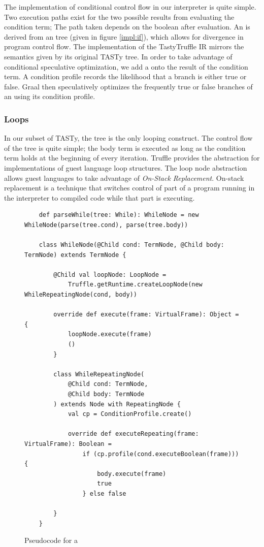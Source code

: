The implementation of conditional control flow in our interpreter is quite simple.
Two execution paths exist for the two possible results from evaluating the condition term; The path taken depends on the boolean after evaluation.
An  is derived from an  tree (given in figure \ref{impl:if}), which allows for divergence in program control flow.
The implementation of the TastyTruffle IR mirrors the semantics given by its original TASTy tree.
In order to take advantage of conditional speculative optimization, we add a  onto the result of the condition term.
A condition profile records the likelihood that a branch is either true or false.
Graal then speculatively optimizes the frequently true or false branches of an  using its condition profile.

\subsubsection*{Loops}

In our subset of TASTy, the  tree is the only looping construct.
The control flow of the  tree is quite simple; the body term is executed as long as the condition term holds at the beginning of every iteration.
Truffle provides the  abstraction for implementations of guest language loop structures.
The loop node abstraction allows guest languages to take advantage of \textit{On-Stack Replacement}\cite{osr}.
On-stack replacement is a technique that switches control of part of a program running in the interpreter to compiled code while that part is executing.

\begin{figure}[!htb]
	\begin{verbatim}
	def parseWhile(tree: While): WhileNode = new WhileNode(parse(tree.cond), parse(tree.body))	
		
	class WhileNode(@Child cond: TermNode, @Child body: TermNode) extends TermNode {
		
		@Child val loopNode: LoopNode = 
			Truffle.getRuntime.createLoopNode(new WhileRepeatingNode(cond, body))
		
		override def execute(frame: VirtualFrame): Object = {
			loopNode.execute(frame)
			()
		}
		
		class WhileRepeatingNode(
			@Child cond: TermNode, 
			@Child body: TermNode
		) extends Node with RepeatingNode {
			val cp = ConditionProfile.create()
			
			override def executeRepeating(frame: VirtualFrame): Boolean = 
				if (cp.profile(cond.executeBoolean(frame))) {
					body.execute(frame)
					true 
				} else false 
				
		}
	}
	\end{verbatim}
	\caption{Pseudocode for a }
	\label{impl:while}
\end{figure}

